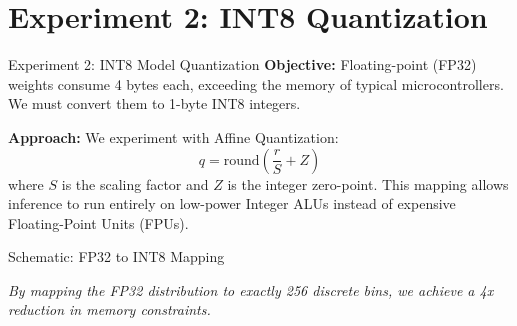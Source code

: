 \documentclass[aspectratio=169]{beamer}
\begin{document}
\section{Experiment 2: INT8 Quantization}

\begin{frame}{Experiment 2: INT8 Model Quantization}
    \textbf{Objective:} Floating-point (FP32) weights consume 4 bytes each, exceeding the memory of typical microcontrollers. We must convert them to 1-byte INT8 integers.
    
    \vspace{0.3cm}
    \textbf{Approach:} We experiment with Affine Quantization:
    \begin{equation}
        q = \text{round}\left(\frac{r}{S} + Z\right)
    \end{equation}
    where $S$ is the scaling factor and $Z$ is the integer zero-point. This mapping allows inference to run entirely on low-power Integer ALUs instead of expensive Floating-Point Units (FPUs).
\end{frame}

\begin{frame}{Schematic: FP32 to INT8 Mapping}
    \begin{center}
    \end{center}
    \vspace{0.3cm}
    \small \textit{By mapping the FP32 distribution to exactly 256 discrete bins, we achieve a 4x reduction in memory constraints.}
\end{frame}
\end{document}
